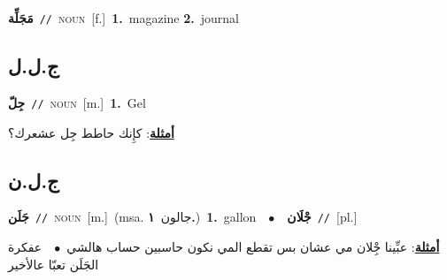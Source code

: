 \documentclass[10pt,a4paper,twoside]{article} %
\begin{document}
\begin{multicols}{2}
{\setlength\topsep{0pt}\textbf{\foreignlanguage{arabic}{مَجَلِّة}}\ {\color{gray}\texttt{//}\color{black}}\ \textsc{noun}\ [f.]\ \textbf{1.}~magazine  \textbf{2.}~journal\ } \vspace{2mm}

\vspace{-3mm}
\subsection*{\color{blue}\foreignlanguage{arabic}{ج.ل.ل}\color{blue}{ (ntws)}} 

{\setlength\topsep{0pt}\textbf{\foreignlanguage{arabic}{جِلّ}}\ {\color{gray}\texttt{//}\color{black}}\ \textsc{noun}\ [m.]\ \textbf{1.}~Gel\  \begin{flushright}\color{gray}\foreignlanguage{arabic}{\textbf{\underline{\foreignlanguage{arabic}{أمثلة}}}: كإِنك حاطط جِل عشعرك؟}\end{flushright}\color{black}} \vspace{2mm}

\vspace{-3mm}
\subsection*{\color{blue}\foreignlanguage{arabic}{ج.ل.ن}\color{blue}{ (ntws)}} 

{\setlength\topsep{0pt}\textbf{\foreignlanguage{arabic}{جَلَن}}\ {\color{gray}\texttt{//}\color{black}}\ \textsc{noun}\ [m.]\ \color{gray}(msa. \foreignlanguage{arabic}{جالون}~\foreignlanguage{arabic}{\textbf{١.}})\color{black}\ \textbf{1.}~gallon\ \ $\bullet$\ \ \setlength\topsep{0pt}\textbf{\foreignlanguage{arabic}{جْلَان}}\ {\color{gray}\texttt{//}\color{black}}\ [pl.]\  \begin{flushright}\color{gray}\foreignlanguage{arabic}{\textbf{\underline{\foreignlanguage{arabic}{أمثلة}}}: عبِّينا جِْلان مي عشان بس تقطع المي نكون حاسبين حساب هالشي\ $\bullet$\ \  عفكرة الجَلَن تعبّا عالأخير}\end{flushright}\color{black}} \vspace{2mm}


\end{multicols}
\end{document}
